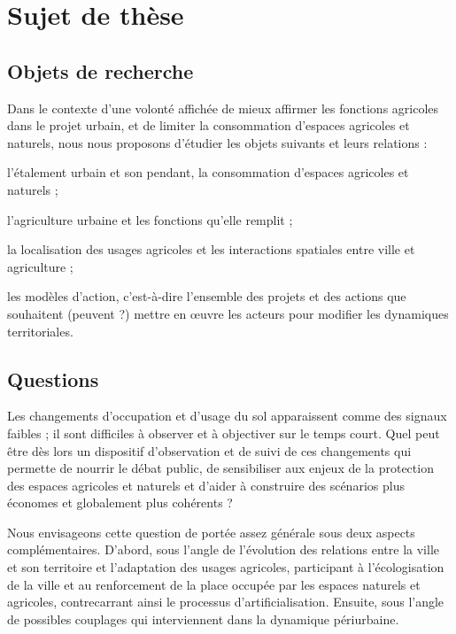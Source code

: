 \page[yes]
\section[sujet]{Sujet de thèse}

\subsection{Objets de recherche}

Dans le contexte d'une volonté affichée de mieux affirmer les fonctions agricoles
dans le projet urbain,
et de limiter la consommation d'espaces agricoles et naturels,
nous nous proposons d'étudier les objets suivants et leurs relations :

\startitemize[packed]

\item l'étalement urbain et son pendant, la consommation d'espaces agricoles et naturels ;
\item l'agriculture urbaine et les fonctions qu'elle remplit ;
\item la localisation des usages agricoles
  et les interactions spatiales entre ville et agriculture ;
\item les modèles d'action, c'est-à-dire l'ensemble
  des projets et des actions que souhaitent (peuvent ?) mettre en œuvre
  les acteurs pour modifier les dynamiques territoriales.

\stopitemize

\subsection{Questions}

Les changements d'occupation et d'usage du sol apparaissent comme des signaux faibles ;
il sont difficiles à observer et à objectiver sur le temps court.
Quel peut être dès lors un dispositif d'observation et de suivi de ces changements
qui permette de nourrir le débat public, de sensibiliser aux enjeux de la protection
des espaces agricoles et naturels et d'aider à construire des scénarios
plus économes et globalement plus cohérents ?

Nous envisageons cette question de portée assez générale
sous deux aspects complémentaires. D'abord, sous l'angle de 
l'évolution des relations entre la ville et son territoire et l'adaptation
des usages agricoles, participant à l'écologisation de la ville et
au renforcement de la place occupée par les espaces naturels et agricoles,
contrecarrant ainsi le processus d'artificialisation.
Ensuite, sous l'angle de possibles couplages
qui interviennent dans la dynamique périurbaine.

